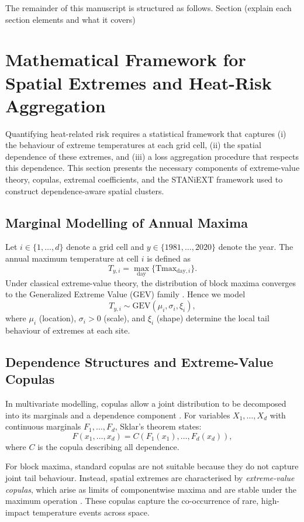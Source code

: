 \documentclass[12pt]{article}
\begin{document}
The remainder of this manuscript is structured as follows. Section (explain each section elements and what it covers)




\section{Mathematical Framework for Spatial Extremes and Heat-Risk Aggregation}

Quantifying heat-related risk requires a statistical framework that captures (i) the behaviour
of extreme temperatures at each grid cell, (ii) the spatial dependence of these extremes,
and (iii) a loss aggregation procedure that respects this dependence. This section presents
the necessary components of extreme-value theory, copulas, extremal coefficients, and the
STANiEXT framework used to construct dependence-aware spatial clusters.

\subsection{Marginal Modelling of Annual Maxima}

Let $i \in \{1,\dots,d\}$ denote a grid cell and $y \in \{1981,\dots,2020\}$ denote the year.
The annual maximum temperature at cell $i$ is defined as
\[
T_{y,i} = \max_{\text{day}} \{ \mathrm{Tmax}_{\text{day},i} \}.
\]
Under classical extreme-value theory, the distribution of block maxima converges to the
Generalized Extreme Value (GEV) family \citep{coles2001introduction}. Hence we model
\[
T_{y,i} \sim \mathrm{GEV}(\mu_i,\sigma_i,\xi_i),
\]
where $\mu_i$ (location), $\sigma_i>0$ (scale), and $\xi_i$ (shape) determine the local
tail behaviour of extremes at each site.

\subsection{Dependence Structures and Extreme-Value Copulas}

In multivariate modelling, copulas allow a joint distribution to be decomposed into its
marginals and a dependence component \citep{nelsen2006introduction}. For variables
$X_1,\dots,X_d$ with continuous marginals $F_1,\dots,F_d$, Sklar’s theorem states:
\[
F(x_1,\dots,x_d) = C\!\left(F_1(x_1),\dots,F_d(x_d)\right),
\]
where $C$ is the copula describing all dependence.

For block maxima, standard copulas are not suitable because they do not capture joint
tail behaviour. Instead, spatial extremes are characterised by \emph{extreme-value copulas},
which arise as limits of componentwise maxima and are stable under the maximum
operation \citep{davison2012statistical}. These copulas capture the co-occurrence of rare,
high-impact temperature events across space.
\end{document}
